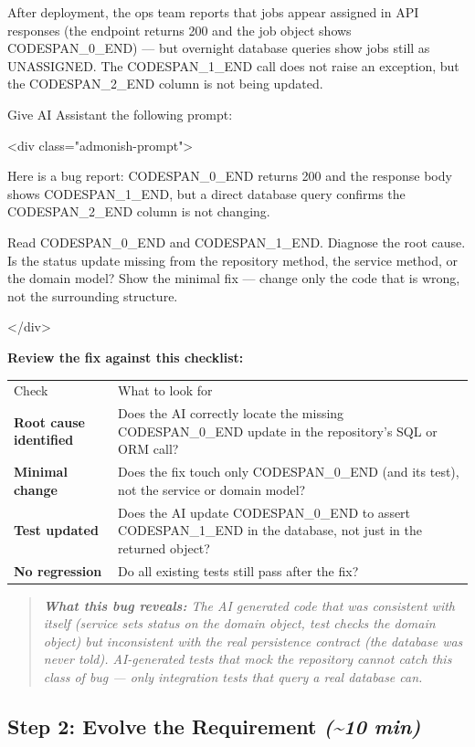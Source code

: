 \documentclass[11pt,a4paper]{book}
\begin{document}
After deployment, the ops team reports that jobs appear assigned in API responses (the endpoint returns 200 and the job object shows CODESPAN\_0\_END) --- but overnight database queries show jobs still as UNASSIGNED. The CODESPAN\_1\_END call does not raise an exception, but the CODESPAN\_2\_END column is not being updated.

Give AI Assistant the following prompt:

<div class="admonish-prompt">

Here is a bug report: CODESPAN\_0\_END returns 200 and the response body shows CODESPAN\_1\_END, but a direct database query confirms the CODESPAN\_2\_END column is not changing.

Read CODESPAN\_0\_END and CODESPAN\_1\_END. Diagnose the root cause. Is the status update missing from the repository method, the service method, or the domain model? Show the minimal fix --- change only the code that is wrong, not the surrounding structure.

</div>

\textbf{Review the fix against this checklist:}

\begin{tabular}{ll}
\hline
Check & What to look for \\
\textbf{Root cause identified} & Does the AI correctly locate the missing CODESPAN\_0\_END update in the repository's SQL or ORM call? \\
\textbf{Minimal change} & Does the fix touch only CODESPAN\_0\_END (and its test), not the service or domain model? \\
\textbf{Test updated} & Does the AI update CODESPAN\_0\_END to assert CODESPAN\_1\_END in the database, not just in the returned object? \\
\textbf{No regression} & Do all existing tests still pass after the fix? \\
\hline
\end{tabular}

\begin{quote}
\textit{\textbf{What this bug reveals:} The AI generated code that was consistent with itself (service sets status on the domain object, test checks the domain object) but inconsistent with the real persistence contract (the database was never told). AI-generated tests that mock the repository cannot catch this class of bug --- only integration tests that query a real database can.}
\end{quote}

\subsection{Step 2: Evolve the Requirement \textit{(\textasciitilde{}10 min)}}
\end{document}

